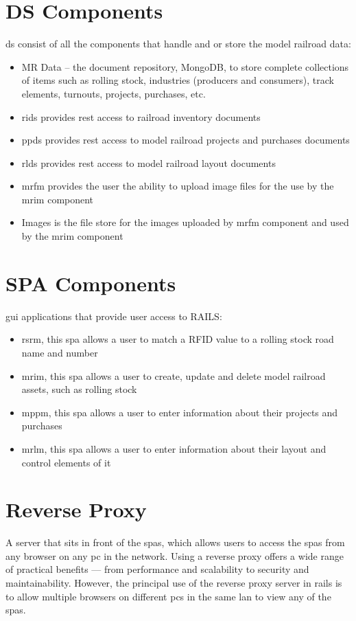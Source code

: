 \section{DS Components}
\gls{ds} consist of all the components that handle and or store the model railroad data:
\begin{itemize}
  \item MR Data – the document repository, MongoDB, to store complete collections of items such as rolling stock, industries (producers and consumers), track elements, turnouts, projects, purchases, etc.
  \item \gls{rids} provides \gls{rest} access to railroad inventory documents
  \item \gls{ppds} provides \gls{rest} access to model railroad projects and purchases documents
  \item \gls{rlds} provides \gls{rest} access to model railroad layout documents
  \item \gls{mrfm} provides the user the ability to upload image files for the use by the \gls{mrim} component
  \item Images is the file store for the images uploaded by \gls{mrfm} component and used by the \gls{mrim} component
\end{itemize}
\section{SPA Components}
\gls{gui} applications that provide user access to RAILS:
\begin{itemize}
  \item \gls{rsrm}, this \gls{spa} allows a user to match a RFID value to a rolling stock road name and number
  \item \gls{mrim}, this \gls{spa} allows a user to create, update and delete model railroad assets, such as rolling stock
  \item \gls{mppm}, this \gls{spa} allows a user to enter information about their projects and purchases
  \item \gls{mrlm}, this \gls{spa} allows a user to enter information about their layout and control elements of it
\end{itemize}
\section{Reverse Proxy}
A server that sits in front of the \glspl{spa}, which allows users to access the \glspl{spa} from any browser on any \gls{pc} in the network. Using a reverse proxy offers a wide range of practical benefits — from performance and scalability to security and maintainability. However, the principal use of the reverse proxy server in \gls{rails} is to allow multiple browsers on different \glspl{pc} in the same \gls{lan} to view any of the \glspl{spa}.

